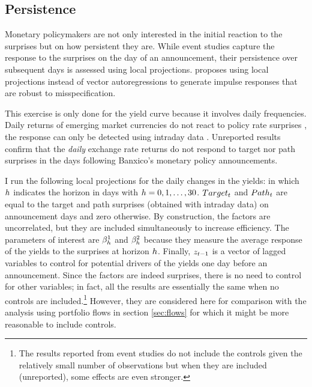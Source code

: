 {\subsection{Persistence} \label{sec:persistenceyc}
Monetary policymakers are not only interested in the initial reaction to the surprises but on how persistent they are. 
While event studies capture the response to the surprises on the day of an announcement, their persistence over subsequent days is assessed using local projections. 
\textcite{Jorda:2005} proposes using local projections instead of vector autoregressions to generate impulse responses that are robust to misspecification. 

This exercise is only done for the yield curve because it involves daily frequencies. 
Daily returns of emerging market currencies do not react to policy rate surprises \parencite{Kohlscheen:2014}, the response can only be detected using intraday data \parencite{Solis:FX}. 
Unreported results confirm that the \textit{daily} exchange rate returns do not respond to target nor path surprises in the days following Banxico's monetary policy announcements.

I run the following local projections for the daily changes in the yields:
\noindent in which \(h\) indicates the horizon in days with \(h = 0, 1, \ldots, 30\). 
\(Target_{t}\) and \(Path_{t}\) are equal to the target and path surprises (obtained with intraday data) on announcement days and zero otherwise. 
By construction, the factors are uncorrelated, but they are included simultaneously to increase efficiency. 
The parameters of interest are \(\beta^{1}_{h}\) and \(\beta^{2}_{h}\) because they measure the average response of the yields to the surprises at horizon \(h\). 
Finally, \(z_{t-1}\) is a vector of lagged variables to control for potential drivers of the yields one day before an announcement. 
Since the factors are indeed surprises, there is no need to control for other variables; in fact, all the results are essentially the same when no controls are included.\footnote{ The results reported from event studies do not include the controls given the relatively small number of observations but when they are included (unreported), some effects are even stronger.} 
However, they are considered here for comparison with the analysis using portfolio flows in section \ref{sec:flows} for which it might be more reasonable to include controls. 

}

